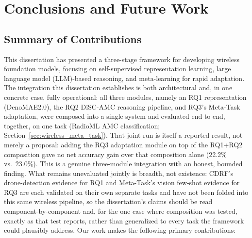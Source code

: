 %
%

\chapter{Conclusions and Future Work}
\label{chap:concl}

\section{Summary of Contributions}
This dissertation has presented a three-stage framework for developing wireless foundation models, focusing on self-supervised representation learning, large language model (LLM)-based reasoning, and meta-learning for rapid adaptation. The integration this dissertation establishes is both architectural and, in one concrete case, fully operational: all three modules, namely an RQ1 representation (DenoMAE2.0), the RQ2 DiSC-AMC reasoning pipeline, and RQ3's Meta-Task adaptation, were composed into a single system and evaluated end to end, together, on one task (RadioML AMC classification; Section~\ref{sec:wireless_meta_task}). That joint run is itself a reported result, not merely a proposal: adding the RQ3 adaptation module on top of the RQ1+RQ2 composition gave no net accuracy gain over that composition alone (22.2\% vs.\ 23.0\%). This is a genuine three-module integration with an honest, bounded finding. What remains unevaluated jointly is breadth, not existence: CDRF's drone-detection evidence for RQ1 and Meta-Task's vision few-shot evidence for RQ3 are each validated on their own separate tasks and have not been folded into this same wireless pipeline, so the dissertation's claims should be read component-by-component and, for the one case where composition was tested, exactly as that test reports, rather than generalized to every task the framework could plausibly address. Our work makes the following primary contributions:

